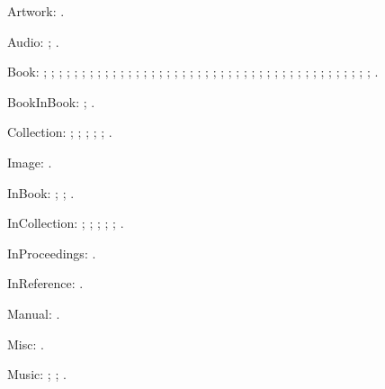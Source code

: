 \documentclass[a4paper,12pt]{report}
\begin{document}
Artwork: \autocite{leo:madonna}.

Audio: \autocite{greek:filmstrip}; \autocite{weed:flatiron}.

Book: \autocite{barrows:reading}; \autocite{churchill:letters};
\autocite{cohen:schiff}; \autocite{cotton:manufacture};
\autocite{creasey:ashe:blast}; \autocite{creasey:morton:hide};
\autocite{creasey:york:death}; \autocite{davenport:attention};
\autocite{feydeau:farces}; \autocite{furet:passing:eng};
\autocite{furet:passing:fr}; \autocite{hopp:attalid};
\autocite{howell:marriage}; \autocite{lach:asia};
\autocite{lecarre:quest}; \autocite{levistrauss:savage};
\autocite{lynch:webstyle}; \autocite{maisonneuve:relations};
\autocite{mchugh:wake}; \autocite{menchu:crossing};
\autocite{meredith:letters}; \autocite{michelangelo:poems};
\autocite{mla:style}; \autocite{natrecoff:camera};
\autocite{palmatary:pottery}; \autocite{pelikan:christian};
\autocite{rodman:walk}; \autocite{schellinger:novel};
\autocite{sechzer:women}; \autocite{sereny:cries};
\autocite{soltes:georgia}; \autocite{stendhal:parma};
\autocite{suangtho:tectona}; \autocite{thompson:making};
\autocite{tillich:system}; \autocite{times:guide};
\autocite{turabian:manual}; \autocite{walker:columbia};
\autocite{wauchope:ceramics}; \autocite{weber:saugetiere};
\autocite{weresz}; \autocite{white:total};
\autocite{wright:evolution}; \autocite{wright:theory}.

BookInBook: \autocite{bernhard:boris}; \autocite{bernhard:ritter}.

Collection: \autocite{brush:ornithology};
\autocite{harley:cartography}; \autocite{harley:ancient:cart};
\autocite{kamrany:economic}; \autocite{prairie:state};
\autocite{zukowsky:chicago}.

Image: \autocite{bedford:photo}.

InBook: \autocite{ashbrook:brain}; \autocite{phibbs:diary};
\autocite{will:cohere}.

InCollection: \autocite{centinel:letters}; \autocite{ellet:galena};
\autocite{keating:dearborn}; \autocite{lippincott:chicago};
\autocite{sirosh:visualcortex}; \autocite{wiens:avian}.

InProceedings: \autocite{frede:inproc}.

InReference: \autocite[absolute]{oed:cdrom}.

Manual: \autocite{dyna:browser}.

Misc: \autocite{roosevelt:speech}.

Music: \autocite{floyd:atom}; \autocite{mozart:figaro};
\autocite{rubinstein:chopin}.
\end{document}
